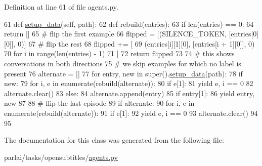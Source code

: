 Definition at line 61 of file agents.\+py.


\begin{DoxyCode}
61     \textcolor{keyword}{def }\hyperlink{namespaceparlai_1_1tasks_1_1multinli_1_1agents_a4fa2cb0ba1ed745336ad8bceed36b841}{setup\_data}(self, path):
62         \textcolor{keyword}{def }rebuild(entries):
63             \textcolor{keywordflow}{if} len(entries) == 0:
64                 \textcolor{keywordflow}{return} []
65             \textcolor{comment}{# flip the first example}
66             flipped = [(SILENCE\_TOKEN, [entries[0][0]], 0)]
67             \textcolor{comment}{# flip the rest}
68             flipped += [
69                 (entries[i][1][0], [entries[i + 1][0]], 0)
70                 \textcolor{keywordflow}{for} i \textcolor{keywordflow}{in} range(len(entries) - 1)
71             ]
72             \textcolor{keywordflow}{return} flipped
73 
74         \textcolor{comment}{# this shows conversations in both directions}
75         \textcolor{comment}{# we skip examples for which no label is present}
76         alternate = []
77         \textcolor{keywordflow}{for} entry, new \textcolor{keywordflow}{in} super().\hyperlink{namespaceparlai_1_1tasks_1_1multinli_1_1agents_a4fa2cb0ba1ed745336ad8bceed36b841}{setup\_data}(path):
78             \textcolor{keywordflow}{if} new:
79                 \textcolor{keywordflow}{for} i, e \textcolor{keywordflow}{in} enumerate(rebuild(alternate)):
80                     \textcolor{keywordflow}{if} e[1]:
81                         \textcolor{keywordflow}{yield} e, i == 0
82                 alternate.clear()
83             \textcolor{keywordflow}{else}:
84                 alternate.append(entry)
85             \textcolor{keywordflow}{if} entry[1]:
86                 \textcolor{keywordflow}{yield} entry, new
87 
88         \textcolor{comment}{# flip the last episode}
89         \textcolor{keywordflow}{if} alternate:
90             \textcolor{keywordflow}{for} i, e \textcolor{keywordflow}{in} enumerate(rebuild(alternate)):
91                 \textcolor{keywordflow}{if} e[1]:
92                     \textcolor{keywordflow}{yield} e, i == 0
93             alternate.clear()
94 
95 
\end{DoxyCode}


The documentation for this class was generated from the following file\+:\begin{DoxyCompactItemize}
\item 
parlai/tasks/opensubtitles/\hyperlink{parlai_2tasks_2opensubtitles_2agents_8py}{agents.\+py}\end{DoxyCompactItemize}
